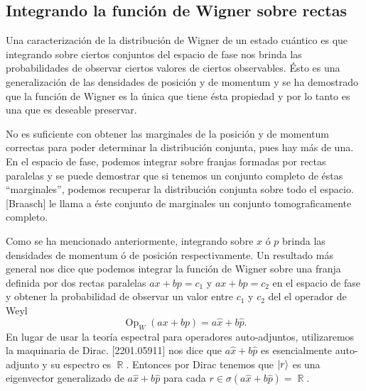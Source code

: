 \documentclass[a4paper]{report}
\DeclareMathOperator{\R}{\mathbb{R}}
\DeclareMathOperator{\Op}{Op}
\begin{document}
  \subsection{Integrando la función de Wigner sobre rectas}

  Una caracterización de la distribución de Wigner de un
  estado cuántico es que integrando sobre ciertos conjuntos
  del espacio de fase nos brinda las probabilidades de
  observar ciertos valores de ciertos observables. Ésto es
  una generalización de las densidades de posición y de
  momentum y se ha demostrado que la función de Wigner es la
  única que tiene ésta propiedad y por lo tanto es una que
  es deseable preservar.

  No es suficiente con obtener las marginales de la posición
  y de momentum correctas para poder determinar la
  distribución conjunta, pues hay más de una. En el espacio
  de fase, podemos integrar sobre franjas formadas por
  rectas paralelas y se puede demostrar que si tenemos un
  conjunto completo de éstas ``marginales'', podemos
  recuperar la distribución conjunta sobre todo el espacio.
  [Braasch] le llama a éste conjunto de marginales un
  conjunto tomograficamente completo.

  Como se ha mencionado anteriormente, integrando sobre $x$
  ó $p$ brinda las densidades de momentum ó de posición
  respectivamente. Un resultado más general nos dice que
  podemos integrar la función de Wigner sobre una franja
  definida por dos rectas paralelas $ax + bp = c_1$ y $ax +
  bp = c_2$ en el espacio de fase y obtener la probabilidad
  de observar un valor entre $c_1$ y $c_2$ del el operador
  de Weyl
  \[
    \Op_W(ax+bp) = a \hat{x} + b \hat{p}.
  \] 
  En lugar de usar la teoría espectral para operadores
  auto-adjuntos, utilizaremos la maquinaria de Dirac.
  [2201.05911] nos dice que $a \hat{x} + b \hat{p}$ es
  esencialmente auto-adjunto y su espectro es $\R$. Entonces
  por Dirac tenemos que $\ket r$ es una eigenvector
  generalizado de $a \hat{x} + b \hat{p}$ para cada $r \in
  \sigma\left( a \hat{x} + b \hat{p} \right) = \R$. 
\end{document}
